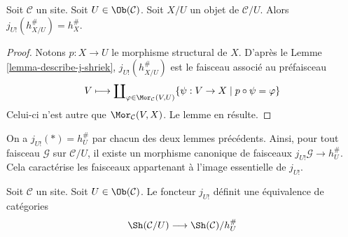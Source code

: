 \begin{lemma}
\label{lemma-describe-j-shriek-representable}
Soit $\mathcal{C}$ un site.
Soit $U \in \Ob(\mathcal{C})$.
Soit $X/U$ un objet de $\mathcal{C}/U$.
Alors $j_{U!}(h_{X/U}^\#) = h_X^\#$.
\end{lemma}

\begin{proof}
Notons $p : X \to U$ le morphisme structural de $X$.
D’après le Lemme \ref{lemma-describe-j-shriek},
$j_{U!}(h_{X/U}^\#)$ est le faisceau associé au préfaisceau
$$
V
\longmapsto
\coprod\nolimits_{\varphi \in \Mor_\mathcal{C}(V, U)}
\{\psi : V \to X \mid p \circ \psi = \varphi\}
$$
Celui-ci n’est autre que $\Mor_\mathcal{C}(V, X)$.
Le lemme en résulte.
\end{proof}

\noindent
On a $j_{U!}(*) = h_U^\#$ par chacun des deux lemmes précédents.
Ainsi, pour tout faisceau $\mathcal{G}$ sur $\mathcal{C}/U$, il existe
un morphisme canonique de faisceaux $j_{U!}\mathcal{G} \to h_U^\#$.
Cela caractérise les faisceaux appartenant à l’image essentielle de $j_{U!}$.

\begin{lemma}
\label{lemma-essential-image-j-shriek}
Soit $\mathcal{C}$ un site.
Soit $U \in \Ob(\mathcal{C})$.
Le foncteur $j_{U!}$ définit une équivalence de catégories
$$
\Sh(\mathcal{C}/U)
\longrightarrow
\Sh(\mathcal{C})/h_U^\#
$$
\end{lemma}


